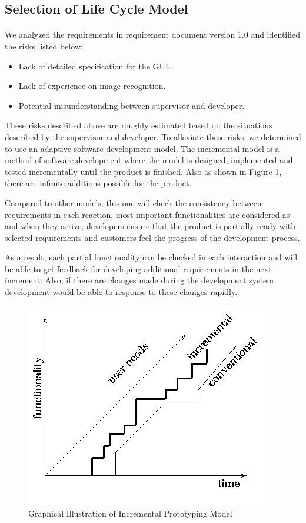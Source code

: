 \subsection{Selection of Life Cycle Model}
\paragraph{} We analyzed the requirements in requirement document version 1.0 and identified the risks listed below:
\begin{itemize}
\item Lack of detailed specification for the GUI.
\item Lack of experience on image recognition.
\item Potential misunderstanding between supervisor and developer.
\end{itemize}
\par These risks described above are roughly estimated based on the situations described by the supervisor and developer. To alleviate these risks, we determined to use an adaptive software development model. The incremental model is a method of software development where the model is designed, implemented and tested incrementally until the product is finished. Also as shown in Figure \ref{IncrmentalModel}, there are infinite additions possible for the product.
\par Compared to other models, this one will check the consistency between requirements in each reaction, most important functionalities are considered as and when they arrive, developers ensure that the product is partially ready with selected requirements and customers feel the progress of the development process.
\par As a result, each partial functionality can be checked in each interaction and will be able to get feedback for developing additional requirements in the next increment. Also, if there are changes made during the development system development would be able to response to these changes rapidly.

\begin{figure}[htb]
\centering
\includegraphics[width=.5\textwidth]{section02/assets/IncrementalModel.png}
\caption[Short Caption 2]{\label{IncrmentalModel}Graphical Illustration of Incremental Prototyping Model}
\end{figure}

